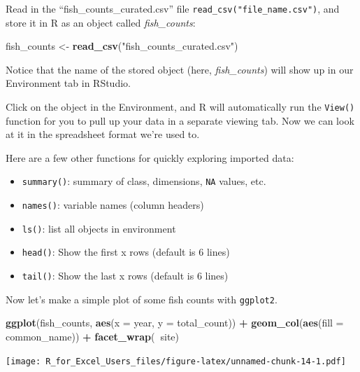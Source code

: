 \documentclass[]{book}
\newenvironment{Shaded}{\begin{snugshade}}{\end{snugshade}}
\newcommand{\DataTypeTok}[1]{\textcolor[rgb]{0.13,0.29,0.53}{#1}}
\newcommand{\KeywordTok}[1]{\textcolor[rgb]{0.13,0.29,0.53}{\textbf{#1}}}
\newcommand{\NormalTok}[1]{#1}
\newcommand{\OperatorTok}[1]{\textcolor[rgb]{0.81,0.36,0.00}{\textbf{#1}}}
\newcommand{\StringTok}[1]{\textcolor[rgb]{0.31,0.60,0.02}{#1}}
\providecommand{\tightlist}{%
  \setlength{\itemsep}{0pt}\setlength{\parskip}{0pt}}
\begin{document}
Read in the ``fish\_counts\_curated.csv'' file \texttt{read\_csv("file\_name.csv")}, and store it in R as an object called \emph{fish\_counts}:

\begin{Shaded}
\begin{Highlighting}[]
\NormalTok{fish_counts <-}\StringTok{ }\KeywordTok{read_csv}\NormalTok{(}\StringTok{"fish_counts_curated.csv"}\NormalTok{)}
\end{Highlighting}
\end{Shaded}

Notice that the name of the stored object (here, \emph{fish\_counts}) will show up in our Environment tab in RStudio.

Click on the object in the Environment, and R will automatically run the \texttt{View()} function for you to pull up your data in a separate viewing tab. Now we can look at it in the spreadsheet format we're used to.

Here are a few other functions for quickly exploring imported data:

\begin{itemize}
\tightlist
\item
  \texttt{summary()}: summary of class, dimensions, \texttt{NA} values, etc.
\item
  \texttt{names()}: variable names (column headers)
\item
  \texttt{ls()}: list all objects in environment
\item
  \texttt{head()}: Show the first x rows (default is 6 lines)
\item
  \texttt{tail()}: Show the last x rows (default is 6 lines)
\end{itemize}

Now let's make a simple plot of some fish counts with \texttt{ggplot2}.

\begin{Shaded}
\begin{Highlighting}[]
\KeywordTok{ggplot}\NormalTok{(fish_counts, }\KeywordTok{aes}\NormalTok{(}\DataTypeTok{x =}\NormalTok{ year, }\DataTypeTok{y =}\NormalTok{ total_count)) }\OperatorTok{+}
\StringTok{  }\KeywordTok{geom_col}\NormalTok{(}\KeywordTok{aes}\NormalTok{(}\DataTypeTok{fill =}\NormalTok{ common_name)) }\OperatorTok{+}
\StringTok{  }\KeywordTok{facet_wrap}\NormalTok{(}\OperatorTok{~}\NormalTok{site)}
\end{Highlighting}
\end{Shaded}

\texttt{[image: R\_for\_Excel\_Users\_files/figure-latex/unnamed-chunk-14-1.pdf]}
\end{document}
